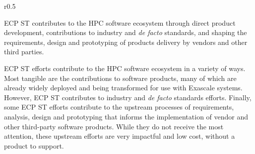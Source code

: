\begin{wrapfigure}{r}{0.5\textwidth}
	\begin{mdframed}
		\large{ECP ST contributes to the HPC software ecosystem through direct product development, contributions to industry and \textit{de facto} standards, and shaping the requirements, design and prototyping of products delivery by vendors and other third parties.}
	\end{mdframed}
\end{wrapfigure}
ECP ST efforts contribute to the HPC software ecosystem in a variety of ways.  Most tangible are the contributions to software products, many of which are already widely deployed and being transformed for use with Exascale systems.  However, ECP ST contributes to industry and \textit{de facto} standards efforts.  Finally, some ECP ST efforts contribute to the upstream processes of requirements, analysis, design and prototyping that informs the implementation of vendor and other third-party software products.  While they do not receive the most attention, these upstream efforts are very impactful and low cost, without a product to support.

%
